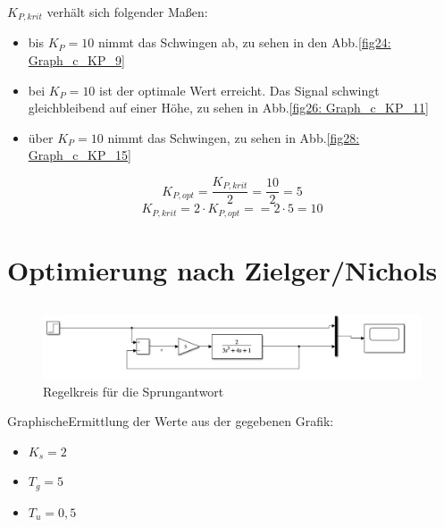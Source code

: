 \documentclass{article}
\begin{document}
			\subsubsection{}
				$K_{P,krit}$ verhält sich folgender Maßen:
				\begin{itemize}
					\item bis $K_P = 10$ nimmt das Schwingen ab, zu sehen in den Abb.\ref{fig24: Graph_c_KP_9}
					\item bei $K_P = 10$ ist der optimale Wert erreicht. Das Signal schwingt gleichbleibend auf einer Höhe, zu sehen in Abb.\ref{fig26: Graph_c_KP_11}
					\item über $K_P = 10$ nimmt das Schwingen, zu sehen in Abb.\ref{fig28: Graph_c_KP_15}
				\end{itemize}
				$$K_{P,opt} = \frac{K_{P,krit}}{2} = \frac{10}{2} = 5$$
				$$K_{P,krit} = 2 \cdot K_{P,opt} == 2 \cdot 5 = 10$$
\newpage
	\section{Optimierung nach Zielger/Nichols}
		\subsection{}
			\begin{figure}[h]
				\includegraphics[scale=0.25, center]{3_a_Regelkreis.png}
				\caption{Regelkreis für die Sprungantwort}
				\label{fig30: Regelkreis}
			\end{figure}
			GraphischeErmittlung der Werte aus der gegebenen Grafik:
			\begin{itemize}
				\item $K_s = 2$
				\item $T_g = 5$
				\item $T_u = 0,5$
			\end{itemize}
\end{document}
